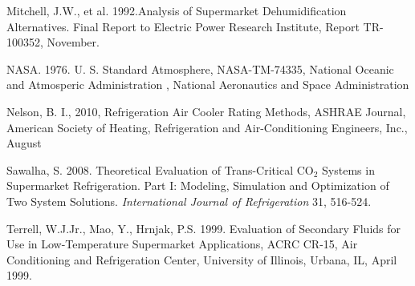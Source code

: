 Mitchell, J.W., et al. 1992.Analysis of Supermarket Dehumidification Alternatives. Final Report to Electric Power Research Institute, Report TR-100352, November.

NASA. 1976. U. S. Standard Atmosphere, NASA-TM-74335, National Oceanic and Atmosperic Administration , National Aeronautics and Space Administration

Nelson, B. I., 2010, Refrigeration Air Cooler Rating Methods, ASHRAE Journal, American Society of Heating, Refrigeration and Air-Conditioning Engineers, Inc., August

Sawalha, S. 2008. Theoretical Evaluation of Trans-Critical CO\(_{2}\) Systems in Supermarket Refrigeration. Part I: Modeling, Simulation and Optimization of Two System Solutions. \emph{International Journal of Refrigeration} 31, 516-524.

Terrell, W.J.Jr., Mao, Y., Hrnjak, P.S. 1999. Evaluation of Secondary Fluids for Use in Low-Temperature Supermarket Applications, ACRC CR-15, Air Conditioning and Refrigeration Center, University of Illinois, Urbana, IL, April 1999.
